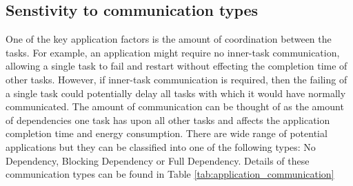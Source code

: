 

   
\subsection{Senstivity to communication types}


One of the key application factors is the amount of coordination
between the tasks. For example, an application might require no
inner-task communication, allowing a single task to fail and restart
without effecting the completion time of other tasks. However, if
inner-task communication is required, then the failing of a single
task could potentially delay all tasks with which it would have
normally communicated. The amount of communication can be thought of
as the amount of dependencies one task has upon all other tasks and
affects the application completion time and energy consumption. There
are wide range of potential applications but they can be classified
into one of the following types: No Dependency, Blocking Dependency or
Full Dependency. Details of these communication types can be found in
Table \ref{tab:application_communication}

